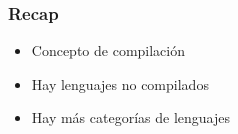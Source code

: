 \documentclass[14pt,aspectratio=169,xcolor=dvipsnames]{beamer}
\begin{document}
\begin{frame}\frametitle{Recap}
    \begin{itemize}
        \item Concepto de compilación
        \item Hay lenguajes no compilados
        \item Hay más categorías de lenguajes
    \end{itemize}
\end{frame}
\begin{frame}
    \maketitle
\end{frame}
\end{document}
